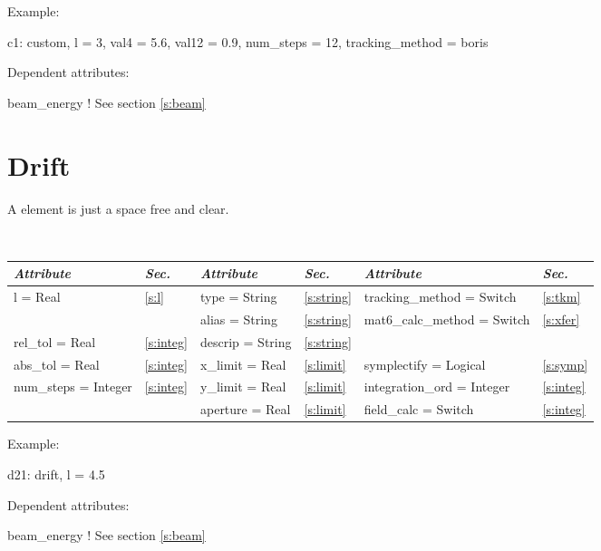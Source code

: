 \noindent
Example:
\begin{example}
  c1: custom, l = 3, val4 = 5.6, val12 = 0.9, num_steps = 12, tracking_method = boris
\end{example}

\vskip0.05in \noindent
Dependent attributes:
\begin{example}
  beam\_energy  ! See section \ref{s:beam}
\end{example}

\section{Drift}
\label{s:drift}

A  element is just a space free and clear.

\toffset
\begin{center}
\tt
\begin{tabular}{|l|l||l|l||l|l|} \hline
  {\sl Attribute} & {\sl Sec.}  & {\sl Attribute} & {\sl Sec.} & {\sl Attribute} & {\sl Sec.} \\ \hline
  l        = Real       & \ref{s:l}     & type = String      & \ref{s:string} & tracking\_method = Switch    & \ref{s:tkm}   \\ \hline
                        &               & alias = String     & \ref{s:string} & mat6\_calc\_method = Switch  & \ref{s:xfer}  \\ \hline
  rel\_tol = Real       & \ref{s:integ} & descrip = String   & \ref{s:string} &                              &               \\ \hline
  abs\_tol = Real       & \ref{s:integ} & x\_limit = Real    & \ref{s:limit}  & symplectify = Logical        & \ref{s:symp}  \\ \hline
  num\_steps = Integer  & \ref{s:integ} & y\_limit = Real    & \ref{s:limit}  & integration\_ord = Integer   & \ref{s:integ} \\ \hline
                        &               & aperture = Real    & \ref{s:limit}  & field\_calc = Switch         & \ref{s:integ} \\ \hline
\end{tabular}
\end{center}
\toffset

\noindent
Example:
\begin{example}
  d21: drift, l = 4.5
\end{example}

\vskip0.05in \noindent
Dependent attributes:
\begin{example}
  beam\_energy  ! See section \ref{s:beam}
\end{example}

